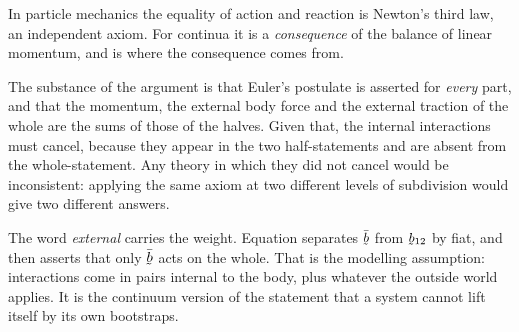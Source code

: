 \begin{remark}\label{rem:ch6actionreaction}
In particle mechanics the equality of action and reaction is Newton's
third law, an independent axiom. For continua it is a
\emph{consequence} of the balance of linear momentum, and  is
where the consequence comes from.

The substance of the argument is that Euler's postulate is asserted for
\emph{every} part, and that the momentum, the external body force and
the external traction of the whole are the sums of those of the halves.
Given that, the internal interactions must cancel, because they appear
in the two half-statements and are absent from the whole-statement. Any
theory in which they did not cancel would be inconsistent: applying the
same axiom at two different levels of subdivision would give two
different answers.

The word \emph{external} carries the weight. Equation 
separates $\bar{\bb}$ from $\bb_{12}$ by fiat, and  then
asserts that only $\bar{\bb}$ acts on the whole. That is the modelling
assumption: interactions come in pairs internal to the body, plus
whatever the outside world applies. It is the continuum version of the
statement that a system cannot lift itself by its own bootstraps.
\end{remark}

